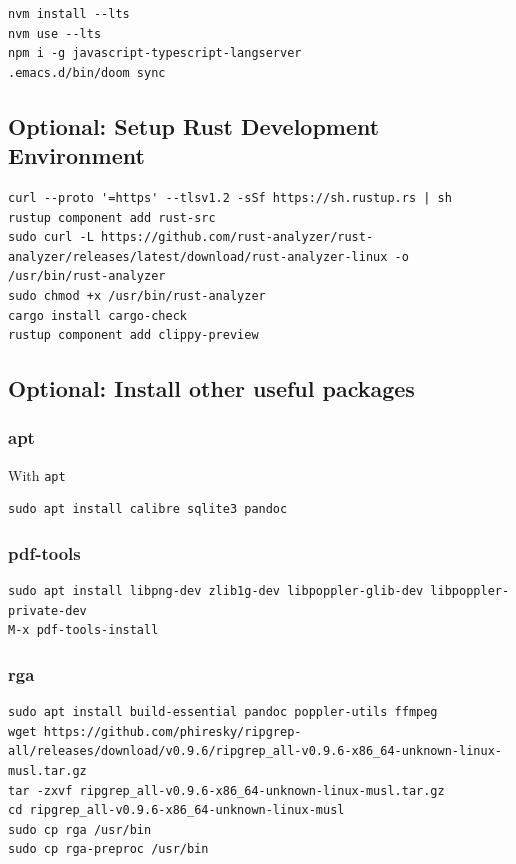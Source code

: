 \documentclass[10pt]{article}
\begin{document}
\begin{verbatim}
nvm install --lts
nvm use --lts
npm i -g javascript-typescript-langserver
.emacs.d/bin/doom sync
\end{verbatim}


\subsection{Optional: Setup Rust Development Environment}
\label{sec:org07cf3fe}
\begin{verbatim}
curl --proto '=https' --tlsv1.2 -sSf https://sh.rustup.rs | sh
rustup component add rust-src
sudo curl -L https://github.com/rust-analyzer/rust-analyzer/releases/latest/download/rust-analyzer-linux -o /usr/bin/rust-analyzer
sudo chmod +x /usr/bin/rust-analyzer
cargo install cargo-check
rustup component add clippy-preview
\end{verbatim}


\subsection{Optional: Install other useful packages}
\label{sec:orgf77da72}
\subsubsection{apt}
\label{sec:org8d706df}
With \texttt{apt}
\begin{verbatim}
sudo apt install calibre sqlite3 pandoc
\end{verbatim}

\subsubsection{pdf-tools}
\label{sec:org21c238d}
\begin{verbatim}
sudo apt install libpng-dev zlib1g-dev libpoppler-glib-dev libpoppler-private-dev
M-x pdf-tools-install
\end{verbatim}

\subsubsection{rga}
\label{sec:org1445cfd}
\begin{verbatim}
sudo apt install build-essential pandoc poppler-utils ffmpeg
wget https://github.com/phiresky/ripgrep-all/releases/download/v0.9.6/ripgrep_all-v0.9.6-x86_64-unknown-linux-musl.tar.gz
tar -zxvf ripgrep_all-v0.9.6-x86_64-unknown-linux-musl.tar.gz
cd ripgrep_all-v0.9.6-x86_64-unknown-linux-musl
sudo cp rga /usr/bin
sudo cp rga-preproc /usr/bin
\end{verbatim}
\end{document}

